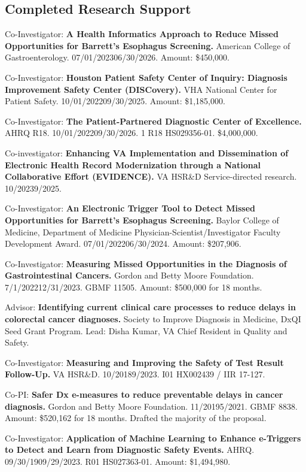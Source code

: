 \documentclass[10pt]{article}
\begin{document}
\subsection*{Completed Research Support}

Co-Investigator: \textbf{A Health Informatics Approach to Reduce Missed Opportunities for Barrett's Esophagus Screening.} American College of Gastroenterology. 07/01/2023\ndash{}06/30/2026. Amount: \$450,000.  %

Co-Investigator: \textbf{Houston Patient Safety Center of Inquiry:
  Diagnosis Improvement Safety Center (DISCovery).} VHA National
Center for Patient Safety. 10/01/2022\ndash{}09/30/2025. Amount:
\$1,185,000.

Co-Investigator: \textbf{The Patient-Partnered Diagnostic Center of
  Excellence.} AHRQ R18. 10/01/2022\ndash{}09/30/2026. 1 R18
HS029356-01. \$4,000,000.

Co-investigator: \textbf{Enhancing VA Implementation and Dissemination
  of Electronic Health Record Modernization through a National
  Collaborative Effort (EVIDENCE).} VA HSR\&D Service-directed
research. 10/2023\ndash{}9/2025.

Co-Investigator: \textbf{An Electronic Trigger Tool to Detect Missed
  Opportunities for Barrett’s Esophagus Screening.} Baylor College of
Medicine, Department of Medicine Physician-Scientist/Investigator
Faculty Development Award. 07/01/2022\ndash{}06/30/2024. Amount:
\$207,906.

Co-Investigator: \textbf{Measuring Missed Opportunities in the
  Diagnosis of Gastrointestinal Cancers.} Gordon and Betty Moore
Foundation. 7/1/2022\ndash{}12/31/2023. GBMF 11505. Amount: \$500,000
for 18 months.

Advisor: \textbf{Identifying current clinical care processes to
  reduce delays in colorectal cancer diagnoses.} Society to Improve
Diagnosis in Medicine, DxQI Seed Grant Program. Lead: Disha Kumar, VA
Chief Resident in Quality and Safety.

Co-Investigator: \textbf{Measuring and Improving the Safety of Test
  Result Follow-Up.} VA HSR\&D. 10/2018\ndash{}9/2023. I01 HX002439 /
IIR 17-127.

Co-PI: \textbf{Safer Dx e-measures to reduce preventable delays in
  cancer diagnosis.} Gordon and Betty Moore Foundation.
11/2019\ndash{}5/2021. GBMF 8838. Amount: \$520,162 for 18 months.
Drafted the majority of the proposal.

Co-Investigator: \textbf{Application of Machine Learning to Enhance
  e-Triggers to Detect and Learn from Diagnostic Safety Events.} AHRQ.
09/30/19\ndash{}09/29/2023. R01 HS027363-01. Amount: \$1,494,980.
\end{document}
